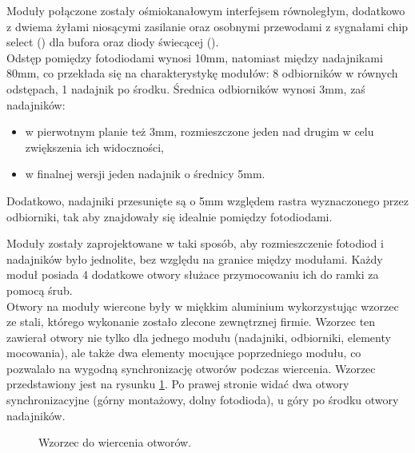 Moduły połączone zostały ośmiokanałowym interfejsem równoległym, dodatkowo z dwiema żyłami niosącymi zasilanie oraz osobnymi przewodami z sygnałami chip select () dla bufora oraz diody świecącej ().\\

Odstęp pomiędzy fotodiodami wynosi 10mm, natomiast między nadajnikami 80mm, co przekłada się na charakterystykę modułów: 8 odbiorników w równych odstępach, 1 nadajnik po środku.
Średnica odbiorników wynosi 3mm, zaś nadajników:
\begin{itemize}
 \item w pierwotnym planie też 3mm, rozmieszczone jeden nad drugim w celu zwiększenia ich widoczności,
 \item w finalnej wersji jeden nadajnik o średnicy 5mm.\\
\end{itemize}

Dodatkowo, nadajniki przesunięte są o 5mm względem rastra wyznaczonego przez odbiorniki, tak aby znajdowały się idealnie pomiędzy fotodiodami.

Moduły zostały zaprojektowane w taki sposób, aby rozmieszczenie fotodiod i nadajników było jednolite, bez względu na granice między modułami. Każdy moduł posiada 4 dodatkowe otwory służace przymocowaniu ich do ramki za pomocą śrub.\\

Otwory na moduły wiercone były w miękkim aluminium wykorzystując wzorzec ze stali, którego wykonanie zostało zlecone zewnętrznej firmie.
Wzorzec ten zawierał otwory nie tylko dla jednego modułu (nadajniki, odbiorniki, elementy mocowania), ale także dwa elementy mocujące poprzedniego modułu, co pozwalało na wygodną synchronizację otworów podczas wiercenia. Wzorzec przedstawiony jest na rysunku \ref{fig:holes_master}. Po prawej stronie widać dwa otwory synchronizacyjne (górny \ppauza montażowy, dolny \ppauza fotodioda), u góry po środku otwory nadajników.\\

\begin{figure}
 \centering
 \makebox[\textwidth][l]{
  \resizebox{.9\largefigure}{!}{
    \def\svgwidth{0.9\largefigure}
    
  }
 }
 \caption{Wzorzec do wiercenia otworów.}
 \label{fig:holes_master}
\end{figure}

